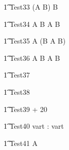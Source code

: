 \begin{circusaction}
   \t1 Test33 \circdef  (A \circseq B) \circtimedinterrupt {} \rcirctime B \\
\end{circusaction}

\begin{circusaction}
   \t1 Test34 \circdef  A \circseq B \circtimedinterrupt {} \rcirctime  A \circseq B \\
\end{circusaction}

\begin{circusaction}
   \t1 Test35 \circdef  A \circseq (B \circtimedinterrupt {} \rcirctime A \circseq B)\\
\end{circusaction}

\begin{circusaction}
   \t1 Test36 \circdef  A \circtimedinterrupt {} \rcirctime B \circtimedinterrupt {} \rcirctime A \circseq B\\
\end{circusaction}


\begin{circusaction}
   \t1 Test37 \circdef  {} \\
\end{circusaction}


\begin{circusaction}
   \t1 Test38 \circdef   {}  \\
\end{circusaction}

\begin{circusaction}
   \t1 Test39 \circdef   {} + 20  \\
\end{circusaction}

\begin{circusaction}
   \t1 Test40 \circdef \circvres vart : \nat  \circspot  \circwait  vart \\
\end{circusaction}


\begin{circusaction}
   \t1 Test41 \circdef  A \circseq {}   \\
\end{circusaction}

